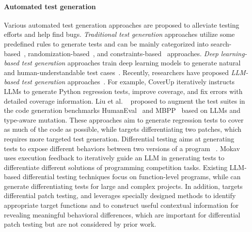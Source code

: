 \paragraph{Automated test generation}
Various automated test generation approaches are proposed to alleviate testing efforts and help find bugs\cite{fraser2011evosuite, lukasczyk2022pynguin, pacheco2007randoop, agitar2023}.
\emph{Traditional test generation} approaches utilize some predefined rules to generate tests and can be mainly categorized into search-based~\cite{fraser2011evosuite, lukasczyk2022pynguin}, randomization-based~\cite{pacheco2007randoop}, and constraints-based~\cite{tillmann2008pex, chang2016constraint} approaches.
\emph{Deep learning-based test generation} approaches train deep learning models to generate natural and human-understandable test cases~\cite{tufano2020unit, alagarsamy2024a3test, dinella2022toga, rao2023cat}.
Recently, researchers have proposed \emph{LLM-based test generation} approaches~\cite{chen2024chatunitest, ryan2024code, pizzorno2024coverup, wang2024hits}.
For example, CoverUp iteratively instructs LLMs to generate Python regression tests, improve coverage, and fix errors with detailed coverage information.
Liu et al. ~\cite{liu2024your} proposed to augment the test suites in the code generation benchmarks HumanEval~\cite{chen2021evaluating} and MBPP~\cite{austin2021program} based on LLMs and type-aware mutation.
These approaches aim to generate regression tests to cover as much of the code as possible, while \appname targets differentiating two patches, which requires more targeted test generation.
Differential testing aims at generating tests to expose different behaviors between two versions of a program ~\cite{evans2007differential, li2023nuances, liu2024llm, etemadi2024mokav}. 
Mokav~\cite{etemadi2024mokav} uses execution feedback to iteratively guide an LLM in generating tests to differentiate different solutions of programming competition tasks.
Existing LLM-based differential testing techniques focus on function-level programs, while \appname can generate differentiating tests for large and complex projects.
In addition, \appname targets differential patch testing, and leverages specially designed methods to identify appropriate target functions and to construct useful contextual information for revealing meaningful behavioral differences, which are important for differential patch testing but are not considered by prior work.












